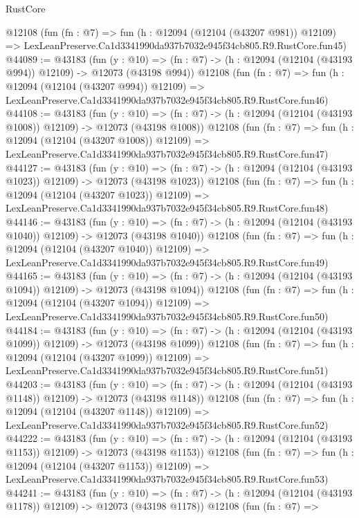 \begin{lexlean}{RustCore}
\begin{coremodule}
    @12108
    (fun (fn : @7) =>
    fun (h : @12094 (@12104 (@43207 @981)) @12109) =>
    LexLeanPreserve.Ca1d3341990da937b7032e945f34cb805.R9.RustCore.fun45)
@44089 := @43183
    (fun (y : @10) =>
    (fn : @7) -> (h : @12094 (@12104 (@43193 @994)) @12109) -> @12073 (@43198 @994))
    @12108
    (fun (fn : @7) =>
    fun (h : @12094 (@12104 (@43207 @994)) @12109) =>
    LexLeanPreserve.Ca1d3341990da937b7032e945f34cb805.R9.RustCore.fun46)
@44108 := @43183
    (fun (y : @10) =>
    (fn : @7) -> (h : @12094 (@12104 (@43193 @1008)) @12109) -> @12073 (@43198 @1008))
    @12108
    (fun (fn : @7) =>
    fun (h : @12094 (@12104 (@43207 @1008)) @12109) =>
    LexLeanPreserve.Ca1d3341990da937b7032e945f34cb805.R9.RustCore.fun47)
@44127 := @43183
    (fun (y : @10) =>
    (fn : @7) -> (h : @12094 (@12104 (@43193 @1023)) @12109) -> @12073 (@43198 @1023))
    @12108
    (fun (fn : @7) =>
    fun (h : @12094 (@12104 (@43207 @1023)) @12109) =>
    LexLeanPreserve.Ca1d3341990da937b7032e945f34cb805.R9.RustCore.fun48)
@44146 := @43183
    (fun (y : @10) =>
    (fn : @7) -> (h : @12094 (@12104 (@43193 @1040)) @12109) -> @12073 (@43198 @1040))
    @12108
    (fun (fn : @7) =>
    fun (h : @12094 (@12104 (@43207 @1040)) @12109) =>
    LexLeanPreserve.Ca1d3341990da937b7032e945f34cb805.R9.RustCore.fun49)
@44165 := @43183
    (fun (y : @10) =>
    (fn : @7) -> (h : @12094 (@12104 (@43193 @1094)) @12109) -> @12073 (@43198 @1094))
    @12108
    (fun (fn : @7) =>
    fun (h : @12094 (@12104 (@43207 @1094)) @12109) =>
    LexLeanPreserve.Ca1d3341990da937b7032e945f34cb805.R9.RustCore.fun50)
@44184 := @43183
    (fun (y : @10) =>
    (fn : @7) -> (h : @12094 (@12104 (@43193 @1099)) @12109) -> @12073 (@43198 @1099))
    @12108
    (fun (fn : @7) =>
    fun (h : @12094 (@12104 (@43207 @1099)) @12109) =>
    LexLeanPreserve.Ca1d3341990da937b7032e945f34cb805.R9.RustCore.fun51)
@44203 := @43183
    (fun (y : @10) =>
    (fn : @7) -> (h : @12094 (@12104 (@43193 @1148)) @12109) -> @12073 (@43198 @1148))
    @12108
    (fun (fn : @7) =>
    fun (h : @12094 (@12104 (@43207 @1148)) @12109) =>
    LexLeanPreserve.Ca1d3341990da937b7032e945f34cb805.R9.RustCore.fun52)
@44222 := @43183
    (fun (y : @10) =>
    (fn : @7) -> (h : @12094 (@12104 (@43193 @1153)) @12109) -> @12073 (@43198 @1153))
    @12108
    (fun (fn : @7) =>
    fun (h : @12094 (@12104 (@43207 @1153)) @12109) =>
    LexLeanPreserve.Ca1d3341990da937b7032e945f34cb805.R9.RustCore.fun53)
@44241 := @43183
    (fun (y : @10) =>
    (fn : @7) -> (h : @12094 (@12104 (@43193 @1178)) @12109) -> @12073 (@43198 @1178))
    @12108
    (fun (fn : @7) =>

\end{coremodule}
\end{lexlean}
